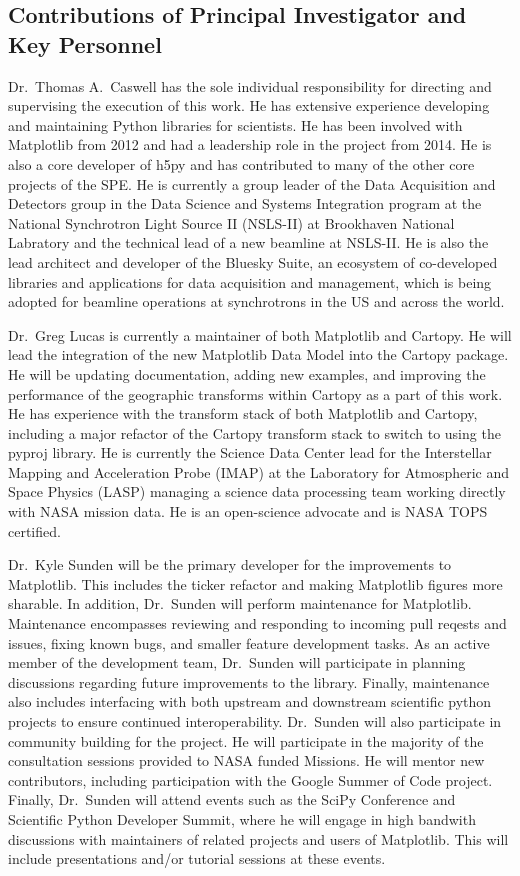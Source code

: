 \documentclass[12pt]{article}
\numberwithin{page}{section}
\begin{document}
\subsection{Contributions of Principal Investigator and Key Personnel}

Dr.\ Thomas A.\ Caswell has the sole individual responsibility for directing
and supervising the execution of this work.  He has extensive experience
developing and maintaining Python libraries for scientists.  He has been
involved with Matplotlib from 2012 and had a leadership role in the project
from 2014.  He is also a core developer of h5py and has contributed to many of
the other core projects of the SPE.  He is currently a group leader of the Data
Acquisition and Detectors group in the Data Science and Systems Integration
program at the National Synchrotron Light Source II (NSLS-II) at Brookhaven
National Labratory and the technical lead of a new beamline at NSLS-II.  He is
also the lead architect and developer of the Bluesky Suite, an ecosystem of
co-developed libraries and applications for data acquisition and management,
which is being adopted for beamline operations at synchrotrons in the US and
across the world.

Dr.\ Greg Lucas is currently a maintainer of both Matplotlib and Cartopy.
He will lead the integration of the new Matplotlib Data Model into the Cartopy package.
He will be updating documentation, adding new examples, and improving the performance of
the geographic transforms within Cartopy as a part of this work. He has experience
with the transform stack of both Matplotlib and Cartopy, including a major refactor
of the Cartopy transform stack to switch to using the pyproj library. He is currently
the Science Data Center lead for the Interstellar Mapping and Acceleration Probe (IMAP)
at the Laboratory for Atmospheric and Space Physics (LASP) managing a science data
processing team working directly with NASA mission data. He is an open-science advocate
and is NASA TOPS certified.

Dr.\ Kyle Sunden will be the primary developer for the improvements to Matplotlib.
This includes the ticker refactor and making Matplotlib figures more sharable.
In addition, Dr.\ Sunden will perform maintenance for Matplotlib.
Maintenance encompasses reviewing and responding to incoming pull reqests and issues, fixing known bugs, and smaller feature development tasks.
As an active member of the development team, Dr.\ Sunden will participate in planning discussions regarding future improvements to the library.
Finally, maintenance also includes interfacing with both upstream and downstream scientific python projects to ensure continued interoperability.
Dr.\ Sunden will also participate in community building for the project.
He will participate in the majority of the consultation sessions provided to NASA funded Missions.
He will mentor new contributors, including participation with the Google Summer of Code project.
Finally, Dr.\ Sunden will attend events such as the SciPy Conference and Scientific Python Developer Summit, where he will engage in high bandwith discussions with maintainers of related projects and users of Matplotlib.
This will include presentations and/or tutorial sessions at these events.
\end{document}
